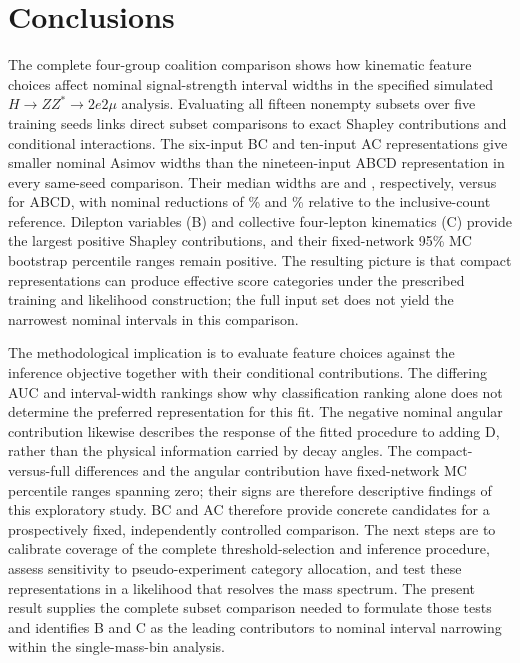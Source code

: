 \documentclass[aps,prd,reprint,superscriptaddress,nofootinbib,longbibliography,floatfix]{revtex4-2}
\let\label\OriginalLaTeXLabel
\begin{document}
\section{Conclusions}
\label{sec:conclusions}

The complete four-group coalition comparison shows how kinematic feature
choices affect nominal signal-strength interval widths in the specified
simulated $H\to ZZ^*\to2e2\mu$ analysis. Evaluating all fifteen nonempty
subsets over five training seeds links direct subset comparisons to exact
Shapley contributions and conditional interactions. The six-input BC and
ten-input AC representations give smaller nominal Asimov widths than the
nineteen-input ABCD representation in every same-seed comparison. Their
median widths are \WidthBC{} and \WidthAC{}, respectively, versus
\WidthABCD{} for ABCD, with nominal reductions of \GainBC\% and \GainAC\%
relative to the inclusive-count reference. Dilepton variables (B) and
collective four-lepton kinematics (C) provide the largest positive Shapley
contributions, and their fixed-network 95\% MC bootstrap percentile ranges
remain positive. The resulting picture is that compact representations can
produce effective score categories under the prescribed training and
likelihood construction; the full input set does not yield the narrowest
nominal intervals in this comparison.

The methodological implication is to evaluate feature choices against the
inference objective together with their conditional contributions. The
differing AUC and interval-width rankings show why classification ranking
alone does not determine the preferred representation for this fit. The
negative nominal angular contribution likewise describes the response of
the fitted procedure to adding D, rather than the physical information
carried by decay angles. The compact-versus-full differences and the angular
contribution have fixed-network MC percentile ranges spanning zero;
their signs are therefore descriptive findings of this exploratory study.
BC and AC therefore provide concrete candidates for a prospectively fixed,
independently controlled comparison. The next steps are to calibrate
coverage of the complete threshold-selection and inference procedure,
assess sensitivity to pseudo-experiment category allocation, and test these
representations in a likelihood that resolves the mass spectrum. The
present result supplies the complete subset comparison needed to formulate
those tests and identifies B and C as the leading contributors to nominal
interval narrowing within the single-mass-bin analysis.
\end{document}
